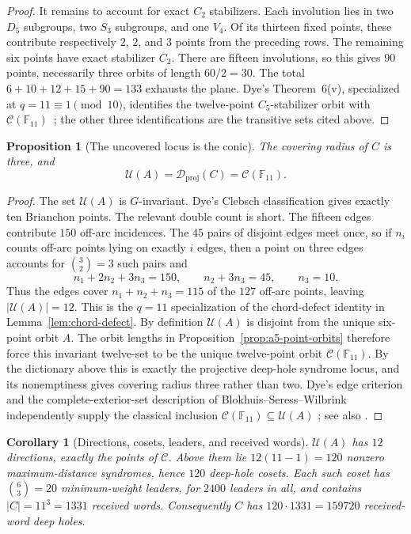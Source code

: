 \documentclass[11pt]{article}
\newtheorem{proposition}[theorem]{Proposition}
\newtheorem{corollary}[theorem]{Corollary}
\theoremstyle{definition}
\theoremstyle{remark}
\newcommand{\F}{\mathbb{F}}
\newcommand{\cC}{\mathcal{C}}
\newcommand{\cU}{\mathcal{U}}
\begin{document}
\begin{proof}
It remains to account for exact $C_2$ stabilizers. Each involution lies in
two $D_5$ subgroups, two $S_3$ subgroups, and one $V_4$. Of its thirteen
fixed points, these contribute respectively $2$, $2$, and $3$ points from
the preceding rows. The remaining six points have exact stabilizer $C_2$.
There are fifteen involutions, so this gives $90$ points, necessarily three
orbits of length $60/2=30$. The total
$6+10+12+15+90=133$ exhausts the plane. Dye's Theorem~6(v), specialized at
$q=11\equiv1\pmod{10}$, identifies the twelve-point $C_5$-stabilizer orbit
with $\cC(\F_{11})$~\cite[pp.~281--282; \S3.1, p.~284]{Dye1991}; the other
three identifications are the transitive sets cited above.
\end{proof}

\begin{proposition}[The uncovered locus is the conic]
\label{prop:deep-holes-conic}
The covering radius of $C$ is three, and
\[
 \cU(A)=\mathcal D_{\mathrm{proj}}(C)=\cC(\F_{11}).
\]
\end{proposition}

\begin{proof}
The set $\cU(A)$ is $G$-invariant. Dye's Clebsch classification gives
exactly ten Brianchon points. The relevant double count is short.
The fifteen edges contribute $150$ off-arc incidences. The $45$ pairs of
disjoint edges meet once, so if $n_i$ counts off-arc points lying on exactly
$i$ edges, then a point on three edges accounts for
$\binom{3}{2}=3$ such pairs and
\[
 n_1+2n_2+3n_3=150,
 \qquad n_2+3n_3=45,
 \qquad n_3=10.
\]
Thus the edges cover $n_1+n_2+n_3=115$ of the $127$ off-arc points, leaving
$|\cU(A)|=12$. This is the $q=11$ specialization of the chord-defect
identity in Lemma~\ref{lem:chord-defect}.
By definition $\cU(A)$ is disjoint from the unique six-point orbit $A$.
The orbit lengths in Proposition~\ref{prop:a5-point-orbits} therefore force
this invariant twelve-set to be the unique twelve-point orbit
$\cC(\F_{11})$. By the dictionary above this is exactly the projective
deep-hole syndrome locus, and its nonemptiness gives covering radius three
rather than two. Dye's edge criterion and the complete-exterior-set
description of Blokhuis--Seress--Wilbrink independently supply the classical
inclusion $\cC(\F_{11})\subseteq\cU(A)$
\cite[discussion preceding Theorem~6, p.~281]{Dye1991}; see also
\cite[pp.~143, 146]{BSW1992}.
\end{proof}

\begin{corollary}[Directions, cosets, leaders, and received words]
\label{cor:named-variety}
$\cU(A)$ has $12$ directions, exactly the points of $\cC$. Above them lie
$12(11-1)=120$ nonzero maximum-distance
syndromes, hence $120$ deep-hole cosets. Each such coset has
$\binom{6}{3}=20$ minimum-weight leaders, for $2400$ leaders in all, and
contains $|C|=11^3=1331$ received words. Consequently $C$ has
$120\cdot1331=159720$ received-word deep holes.
\end{corollary}
\end{document}
